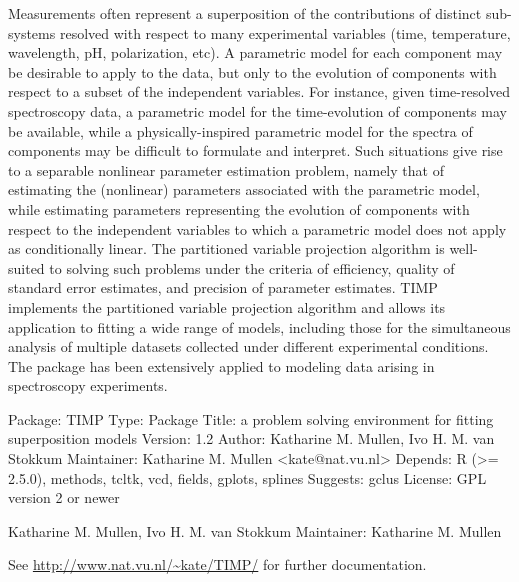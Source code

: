 \begin{Description}\relax
Measurements often represent a superposition of the contributions of distinct
sub-systems resolved with respect to many experimental variables (time,
temperature, wavelength, pH, polarization, etc).  A parametric model for each
component may be desirable to apply to the data, but only to the evolution of
components with respect to a subset of the independent variables.  For
instance, given time-resolved spectroscopy data, a parametric model for the
time-evolution of components may be available, while a physically-inspired
parametric model for the spectra of components may be difficult to formulate
and interpret.  Such situations give rise to a separable nonlinear parameter
estimation problem, namely that of estimating the (nonlinear) parameters
associated with the parametric model, while estimating parameters representing
the evolution of components with respect to the independent variables to which
a parametric model does not apply as conditionally linear.  The partitioned
variable projection algorithm is well-suited to solving such problems under
the criteria of efficiency, quality of standard error estimates, and precision
of parameter estimates.  TIMP implements the partitioned variable projection
algorithm and allows its application to fitting a wide range of models,
including those for the simultaneous analysis of multiple datasets collected
under different experimental conditions.  The package has been extensively
applied to modeling data arising in spectroscopy experiments.
\end{Description}
\begin{Details}\relax
Package: TIMP
Type: Package
Title: a problem solving environment for fitting superposition models
Version: 1.2
Author: Katharine M. Mullen, Ivo H. M. van Stokkum 
Maintainer: Katharine M. Mullen <kate@nat.vu.nl>
Depends: R (>= 2.5.0), methods, tcltk, vcd, fields, gplots, splines
Suggests: gclus
License: GPL version 2 or newer
\end{Details}
\begin{Author}\relax
Katharine M. Mullen, Ivo H. M. van Stokkum  
Maintainer: Katharine M. Mullen 
\end{Author}
\begin{References}\relax
See \url{http://www.nat.vu.nl/~kate/TIMP/} for further 
documentation.
\end{References}

